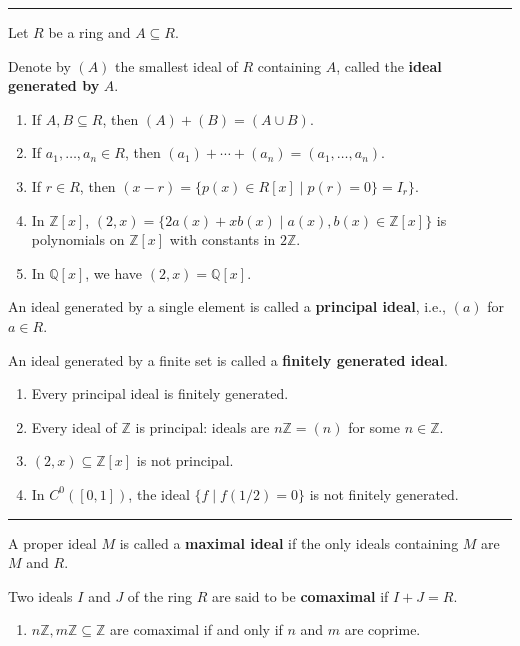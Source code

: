 \documentclass[12pt]{article}
\newcommand{\keyword}[1]{\textbf{#1}}
\newcommand{\sepline}{\rule{\textwidth}{0.4pt}}
\theoremstyle{definition}
\newcommand{\Z}{\mathbb{Z}}
\newcommand{\Q}{\mathbb{Q}}
\newcommand{\<}{\left\langle}
\renewcommand{\>}{\right\rangle}
\begin{document}
\sepline

Let $R$ be a ring and $A \subseteq R$.

Denote by $(A)$ the smallest ideal of $R$ containing $A$, called the \keyword{ideal generated by} $A$.

\begin{enumerate}
    \item If $A, B \subseteq R$, then $(A) + (B) = (A \cup B)$.
    
    \item If $a_1, \dots, a_n \in R$, then $(a_1) + \cdots + (a_n) = (a_1, \dots, a_n)$.
    
    \item If $r \in R$, then $(x - r) = \{p(x) \in R[x] \mid p(r) = 0\} = I_r\}$.
    
    \item In $\Z[x]$, $(2, x) = \{2a(x) + xb(x) \mid a(x), b(x) \in \Z[x]\}$ is polynomials on $\Z[x]$ with constants in $2\Z$.
    
    \item In $\Q[x]$, we have $(2, x) = \Q[x]$.
\end{enumerate}

An ideal generated by a single element is called a \keyword{principal ideal}, i.e., $(a)$ for $a \in R$.

An ideal generated by a finite set is called a \keyword{finitely generated ideal}.

\begin{enumerate}
    \item Every principal ideal is finitely generated.
    
    \item Every ideal of $\Z$ is principal: ideals are $n\Z = (n)$ for some $n \in \Z$.
    
    \item $(2, x) \subseteq \Z[x]$ is not principal.
    
    \item In $C^0([0,1])$, the ideal $\{f \mid f(1/2) = 0\}$ is not finitely generated.
\end{enumerate}

\sepline

A proper ideal $M$ is called a \keyword{maximal ideal} if the only ideals containing $M$ are $M$ and $R$.

Two ideals $I$ and $J$ of the ring $R$ are said to be \keyword{comaximal} if $I + J = R$.

\begin{enumerate}
    \item $n\Z, m\Z \subseteq \Z$ are comaximal if and only if $n$ and $m$ are coprime.
\end{enumerate}
\end{document}
